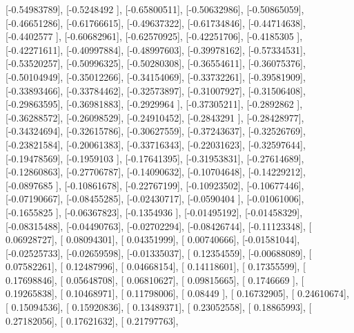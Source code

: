\documentclass{article}
\begin{document}
       [-0.54983789],
       [-0.5248492 ],
       [-0.65800511],
       [-0.50632986],
       [-0.50865059],
       [-0.46651286],
       [-0.61766615],
       [-0.49637322],
       [-0.61734846],
       [-0.44714638],
       [-0.4402577 ],
       [-0.60682961],
       [-0.62570925],
       [-0.42251706],
       [-0.4185305 ],
       [-0.42271611],
       [-0.40997884],
       [-0.48997603],
       [-0.39978162],
       [-0.57334531],
       [-0.53520257],
       [-0.50996325],
       [-0.50280308],
       [-0.36554611],
       [-0.36075376],
       [-0.50104949],
       [-0.35012266],
       [-0.34154069],
       [-0.33732261],
       [-0.39581909],
       [-0.33893466],
       [-0.33784462],
       [-0.32573897],
       [-0.31007927],
       [-0.31506408],
       [-0.29863595],
       [-0.36981883],
       [-0.2929964 ],
       [-0.37305211],
       [-0.2892862 ],
       [-0.36288572],
       [-0.26098529],
       [-0.24910452],
       [-0.2843291 ],
       [-0.28428977],
       [-0.34324694],
       [-0.32615786],
       [-0.30627559],
       [-0.37243637],
       [-0.32526769],
       [-0.23821584],
       [-0.20061383],
       [-0.33716343],
       [-0.22031623],
       [-0.32597644],
       [-0.19478569],
       [-0.1959103 ],
       [-0.17641395],
       [-0.31953831],
       [-0.27614689],
       [-0.12860863],
       [-0.27706787],
       [-0.14090632],
       [-0.10704648],
       [-0.14229212],
       [-0.0897685 ],
       [-0.10861678],
       [-0.22767199],
       [-0.10923502],
       [-0.10677446],
       [-0.07190667],
       [-0.08455285],
       [-0.02430717],
       [-0.0590404 ],
       [-0.01061006],
       [-0.1655825 ],
       [-0.06367823],
       [-0.1354936 ],
       [-0.01495192],
       [-0.01458329],
       [-0.08315488],
       [-0.04490763],
       [-0.02702294],
       [-0.08426744],
       [-0.11123348],
       [ 0.06928727],
       [ 0.08094301],
       [ 0.04351999],
       [ 0.00740666],
       [-0.01581044],
       [-0.02525733],
       [-0.02659598],
       [-0.01335037],
       [ 0.12354559],
       [-0.00688089],
       [ 0.07582261],
       [ 0.12487996],
       [ 0.04668154],
       [ 0.14118601],
       [ 0.17355599],
       [ 0.17698846],
       [ 0.05648708],
       [ 0.06810627],
       [ 0.09815665],
       [ 0.1746669 ],
       [ 0.19265838],
       [ 0.10468971],
       [ 0.11798006],
       [ 0.08449   ],
       [ 0.16732905],
       [ 0.24610674],
       [ 0.15094536],
       [ 0.15920836],
       [ 0.13489371],
       [ 0.23052558],
       [ 0.18865993],
       [ 0.27182056],
       [ 0.17621632],
       [ 0.21797763],
\end{document}
